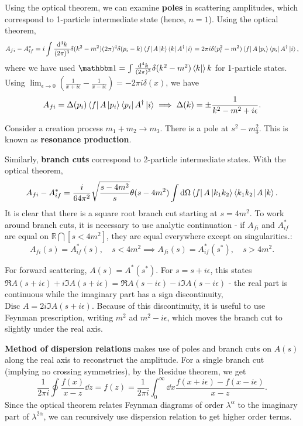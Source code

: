 \documentclass{article}
\begin{document}
Using the optical theorem, we can examine \textbf{poles} in scattering amplitudes, which correspond to 1-particle intermediate state (hence, $n=1$). Using the optical theorem, 
\begin{align*}
    A_{fi}-A^*_{if}=i\int\frac{\dd^4k}{(2\pi)^3}\delta(k^2-m^2)(2\pi)^4\delta(p_i-k)\bra fA\ket k\bra kA^\dag\ket i=2\pi i\delta(p_i^2-m^2)\bra fA\ket{p_i}\bra{p_i}A^\dag\ket i,
\end{align*}
where we have used $\mathbbm 1=\int\frac{\dd^4k}{(2\pi)^3}\delta(k^2-m^2)\bra k\ket k$ for 1-particle states. Using $\lim_{\epsilon\to 0}\left(\frac 1{x+i\epsilon}-\frac 1{x-i\epsilon}\right)=-2\pi i\delta(x)$, we have 
$$A_{fi}=\Delta(p_i)\bra fA\ket{p_i}\bra{p_i}A^\dag\ket i\implies\Delta(k)=\pm\frac 1{k^2-m^2+i\epsilon}.$$

\example Consider a creation process $m_1+m_2\to m_3$. There is a pole at $s^2-m_3^2$. This is known as \textbf{resonance production}.

Similarly, \textbf{branch cuts} correspond to 2-particle intermediate states. With the optical theorem, 
$$A_{fi}-A^*_{if}=\frac i{64\pi^2}\sqrt{\frac{s-4m^2}s}\theta(s-4m^2)\int\dd\Omega\bra fA\ket{k_1k_2}\bra{k_1k_2}A\ket k.$$
It is clear that there is a square root branch cut starting at $s=4m^2$. To work around branch cuts, it is necessary to use analytic continuation - if $A_{fi}$ and $A^*_{if}$ are equal on $\mathbb R\bigcap [s<4m^2]$, they are equal everywhere except on singularities.:
$$A_{fi}(s)=A^*_{if}(s),\quad s<4m^2\implies A_{fi}(s)=A^*_{if}(s^*),\quad s>4m^2.$$

\example For forward scattering, $A(s)=A^*(s^*)$. For $s=s+i\epsilon$, this states $\Re A(s+i\epsilon)+i\Im A(s+i\epsilon)=\Re A(s-i\epsilon)-i\Im A(s-i\epsilon)$ - the real part is continuous while the imaginary part has a sign discontinuity, $\text{Disc }A=2i\Im A(s+i\epsilon)$. Because of this discontinuity, it is useful to use Feynman prescription, writing $m^2$ ad $m^2-i\epsilon$, which moves the branch cut to slightly under the real axis. 

\textbf{Method of dispersion relations} makes use of poles and branch cuts on $A(s)$ along the real axis to reconstruct the amplitude. For a single branch cut (implying no crossing symmetries), by the Residue theorem, we get 
$$\frac 1{2\pi i}\oint\frac{f(x)}{x-z}\dd z=f(z)=\frac 1{2\pi i}\int^\infty_0\dd x\frac{f(x+i\epsilon)-f(x-i\epsilon)}{x-z}.$$
Since the optical theorem relates Feynman diagrams of order $\lambda^\alpha$ to the imaginary part of $\lambda^{2\alpha}$, we can recursively use dispersion relation to get higher order terms.
\end{document}
